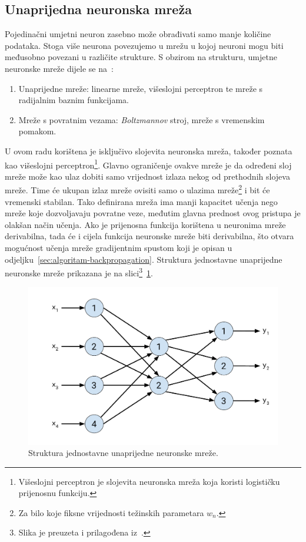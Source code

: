 \subsection{Unaprijedna neuronska mreža}
\label{subsec:unaprijedna-neuronska-mreza}
Pojedinačni umjetni neuron zasebno može obrađivati samo manje količine podataka. Stoga više neurona povezujemo u
mrežu u kojoj neuroni mogu biti međusobno povezani u različite strukture. S obzirom na strukturu, umjetne neuronske
mreže dijele se na\ \citep{cupic2013}:
\begin{enumerate}
    \item Unaprijedne mreže: linearne mreže, višeslojni perceptron te mreže s radijalnim baznim funkcijama.
    \item Mreže s povratnim vezama: \emph{Boltzmannov} stroj, mreže s vremenskim pomakom.
\end{enumerate}
U ovom radu korištena je isključivo slojevita neuronska mreža, također poznata kao višeslojni
perceptron\footnote{Višeslojni perceptron je slojevita neuronska mreža koja koristi logističku prijenosnu funkciju.}.
Glavno ograničenje ovakve mreže je da određeni sloj mreže može kao ulaz dobiti samo vrijednost izlaza nekog od
prethodnih slojeva mreže. Time će ukupan izlaz mreže ovisiti samo o ulazima mreže\footnote{Za bilo koje fiksne
vrijednosti težinskih parametara $w_n$.} i bit će vremenski stabilan. Tako definirana mreža ima manji kapacitet učenja
nego mreže koje dozvoljavaju povratne veze, međutim glavna prednost ovog pristupa je olakšan način učenja. Ako je
prijenosna funkcija korištena u neuronima mreže derivabilna, tada će i cijela funkcija neuronske mreže biti derivabilna,
što otvara mogućnost učenja mreže gradijentnim spustom koji je opisan u odjeljku\ \ref{sec:algoritam-backpropagation}.
Struktura jednostavne unaprijedne neuronske mreže prikazana je na slici\footnote{Slika je preuzeta i prilagođena
iz\ \citep{cupic2013}.}\ \ref{fig:simple-neural-network}.
\begin{figure}[htb]
    \centering
    \includegraphics[width=12cm]{images/chapter3/simple-neural-network.pdf}
    \caption{Struktura jednostavne unaprijedne neuronske mreže.}
    \label{fig:simple-neural-network}
\end{figure}
